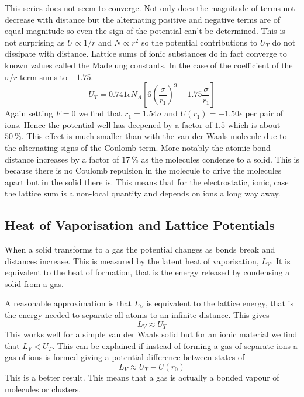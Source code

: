     This series does not seem to converge.
    Not only does the magnitude of terms not decrease with distance but the alternating positive and negative terms are of equal magnitude so even the sign of the potential can't be determined.
    This is not surprising as \(U\propto 1/r\) and \(N\propto r^2\) so the potential contributions to \(U_T\) do not dissipate with distance.
    Lattice sums of ionic substances do in fact converge to known values called the Madelung constants.
    In the case of  the coefficient of the \(\sigma/r\) term sums to \(-1.75\).
    \[U_T = 0.741\epsilon N_A\left[6\left(\frac{\sigma}{r_1}\right)^9 - 1.75\frac{\sigma}{r_1}\right]\]
    Again setting \(F = 0\) we find that \(r_1 = 1.54\sigma\) and \(U(r_1) = -1.50\epsilon\) per pair of ions.
    Hence the potential well has deepened by a factor of \(1.5\) which is about \(\SI{50}{\%}\).
    This effect is much smaller than with the van der Waals molecule due to the alternating signs of the Coulomb term.
    More notably the atomic bond distance increases by a factor of \(\SI{17}{\%}\) as the molecules condense to a solid.
    This is because there is no Coulomb repulsion in the molecule to drive the molecules apart but in the solid there is.
    This means that for the electrostatic, ionic, case the lattice sum is a non-local quantity and depends on ions a long way away.
    
    \subsection{Heat of Vaporisation and Lattice Potentials}
    When a solid transforms to a gas the potential changes as bonds break and distances increase.
    This is measured by the latent heat of vaporisation, \(L_V\).
    It is equivalent to the heat of formation, that is the energy released by condensing a solid from a gas.
    
    A reasonable approximation is that \(L_V\) is equivalent to the lattice energy, that is the energy needed to separate all atoms to an infinite distance.
    This gives
    \[L_V\approx U_T\]
    This works well for a simple van der Waals solid but for an ionic material we find that \(L_V < U_T\).
    This can be explained if instead of forming a gas of separate ions a gas of  ions is formed giving a potential difference between states of
    \[L_V \approx U_T - U(r_0)\]
    This is a better result.
    This means that a  gas is actually a bonded vapour of molecules or clusters.
    
